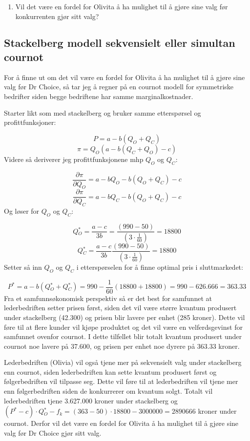 \documentclass[
  12pt,
  a4paper,
  DIV=11,
  numbers=noendperiod]{scrartcl}
\providecommand{\tightlist}{%
  \setlength{\itemsep}{0pt}\setlength{\parskip}{0pt}}\usepackage{longtable,booktabs,array}
\begin{document}
\clearpage

\begin{enumerate}
\def\labelenumi{\alph{enumi})}
\setcounter{enumi}{1}
\tightlist
\item
  Vil det være en fordel for Olivita å ha mulighet til å gjøre sine valg
  før konkurrenten gjør sitt valg?
\end{enumerate}

\subsection{Stackelberg modell sekvensielt eller simultan
cournot}\label{stackelberg-modell-sekvensielt-eller-simultan-cournot}

For å finne ut om det vil være en fordel for Olivita å ha mulighet til å
gjøre sine valg før Dr Choice, så tar jeg å regner på en cournot modell
for symmetriske bedrifter siden begge bedriftene har samme
marginalkostnader.

Starter likt som med stackelberg og bruker samme etterspørsel og
profittfunksjoner:

\[P = a - b(Q_O+Q_C) \tag{10}\] \[\pi = Q_O(a-b(Q_C+Q_O)-c) \tag{11}\]
Videre så deriverer jeg profittfunksjonene mhp \(Q_O\) og \(Q_C\):

\[\frac{\partial \pi}{\partial Q_O} = a -b Q_O - b(Q_O+Q_C) -c \tag{12}\]
\[\frac{\partial \pi}{\partial Q_C} = a -b Q_C - b(Q_O+Q_C) -c \tag{13}\]
Og løser for \(Q_O\) og \(Q_C\):

\[Q{_O^*} = \frac{a-c}{3b} = \frac{(990-50)}{(3 \cdot \frac{1}{60})} = 18800 \tag{14}\]
\[Q{_C^*} = \frac{a-c}{3b} \frac{(990-50)}{(3 \cdot \frac{1}{60})} = 18800 \tag{15}\]
Setter så inn \(Q_O\) og \(Q_C\) i etterspørselen for å finne optimal
pris i sluttmarkedet:

\[P^* = a - b(Q{_O^*}+Q{_C^*}) = 990 - \frac{1}{60}(18800+18800) = 990 - 626.666 = 363.33 \tag{16}\]
Fra et samfunnsøkonomisk perspektiv så er det best for samfunnet at
lederbedriften setter prisen først, siden det vil være større kvantum
produsert under stackelberg (42.300) og prisen blir lavere per enhet
(285 kroner). Dette vil føre til at flere kunder vil kjøpe produktet og
det vil være en velferdsgevinst for samfunnet ovenfor cournot. I dette
tilfellet blir totalt kvantum produsert under cournot noe lavere på
37.600, og prisen per enhet noe dyrere på 363.33 kroner.

Lederbedriften (Olivia) vil også tjene mer på sekvensielt valg under
stackelberg enn cournot, siden lederbedriften kan sette kvantum
produsert først og følgerbedriften vil tilpasse seg. Dette vil føre til
at lederbedriften vil tjene mer enn følgerbedriften siden de konkurrerer
om kvantum solgt. Totalt vil lederbedriften tjene 3.627.000 kroner under
stackelberg og
\((P^* -c) \cdot Q{_O^*} -f_k =(363 -50) \cdot18800 - 3000000 = 2890666\)
kroner under cournot. Derfor vil det være en fordel for Olivita å ha
mulighet til å gjøre sine valg før Dr Choice gjør sitt valg.
\end{document}

